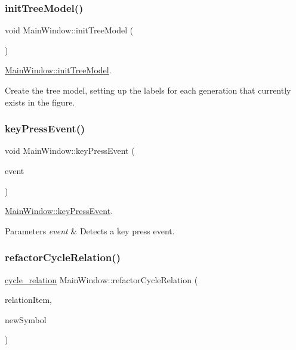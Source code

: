 \subsubsection{\texorpdfstring{init\+Tree\+Model()}{initTreeModel()}}
{\footnotesize\ttfamily void Main\+Window\+::init\+Tree\+Model (\begin{DoxyParamCaption}{ }\end{DoxyParamCaption})}



\mbox{\hyperlink{class_main_window_a3e45090789e16c49079857ab0617b239}{Main\+Window\+::init\+Tree\+Model}}. 

Create the tree model, setting up the labels for each generation that currently exists in the figure. \mbox{\label{class_main_window_a9c4f542263838b9ecd06eae839a42a34}} 
\subsubsection{\texorpdfstring{key\+Press\+Event()}{keyPressEvent()}}
{\footnotesize\ttfamily void Main\+Window\+::key\+Press\+Event (\begin{DoxyParamCaption}\item[{Q\+Key\+Event $\ast$}]{event }\end{DoxyParamCaption})}



\mbox{\hyperlink{class_main_window_a9c4f542263838b9ecd06eae839a42a34}{Main\+Window\+::key\+Press\+Event}}. 


\begin{DoxyParams}{Parameters}
{\em event} & Detects a key press event. \\
\hline
\end{DoxyParams}
\mbox{\label{class_main_window_a9fe708c683a2dd952ccb72e04cf4a62d}} 
\subsubsection{\texorpdfstring{refactor\+Cycle\+Relation()}{refactorCycleRelation()}}
{\footnotesize\ttfamily \mbox{\hyperlink{class_moeb_inv_1_1cycle__relation}{cycle\+\_\+relation}} Main\+Window\+::refactor\+Cycle\+Relation (\begin{DoxyParamCaption}\item[{const Gi\+Na\+C\+::ex \&}]{relation\+Item,  }\item[{const Gi\+Na\+C\+::ex \&}]{new\+Symbol }\end{DoxyParamCaption})}



